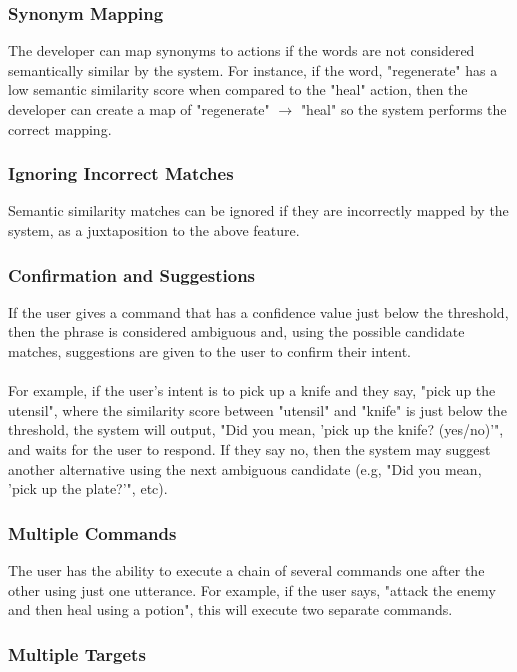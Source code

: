 \documentclass[11pt]{article}
\begin{document}
\subsubsection{Synonym Mapping}

The developer can map synonyms to actions if the words are not considered semantically similar by the system. For instance, if the word, "regenerate" has a low semantic similarity score when compared to the "heal" action, then the developer can create a map of "regenerate" $\rightarrow$ "heal" so the system performs the correct mapping.

\subsubsection{Ignoring Incorrect Matches}

Semantic similarity matches can be ignored if they are incorrectly mapped by the system, as a juxtaposition to the above feature.

\subsubsection{Confirmation and Suggestions}

If the user gives a command that has a confidence value just below the threshold, then the phrase is considered ambiguous and, using the possible candidate matches, suggestions are given to the user to confirm their intent. 
\\
\\
For example, if the user's intent is to pick up a knife and they say, "pick up the utensil", where the similarity score between "utensil" and "knife" is just below the threshold, the system will output, "Did you mean, 'pick up the knife? (yes/no)'", and waits for the user to respond. If they say no, then the system may suggest another alternative using the next ambiguous candidate (e.g, "Did you mean, 'pick up the plate?'", etc).

\subsubsection{Multiple Commands}

The user has the ability to execute a chain of several commands one after the other using just one utterance. For example, if the user says, "attack the enemy and then heal using a potion", this will execute two separate commands.

\subsubsection{Multiple Targets}
\end{document}
